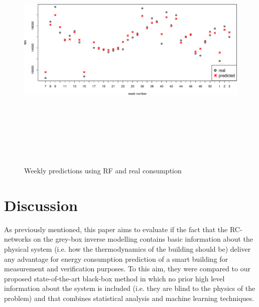 \documentclass[10pt, conference, compsocconf]{IEEEtran}
\begin{document}
\begin{figure}[t!]\label{fig:weekly}%
\centering
\centerline{\includegraphics[width=12cm,height=12cm,keepaspectratio]{./pics/weekly.pdf}}
\caption{Weekly predictions using RF and real consumption}\vspace*{-6pt}
  \label{fig:weekly}
\end{figure}

\section{Discussion}

As previously mentioned, this paper aims to evaluate if the fact that the RC-networks on the grey-box inverse modelling contains basic information about the physical system (i.e. how the thermodynamics of the building should be) deliver any advantage for energy consumption prediction of a smart building for measurement and verification purposes. To this aim, they were compared to our proposed state-of-the-art black-box method in which no prior high level information about the system is included (i.e. they are blind to the physics of the problem) and that combines statistical analysis and machine learning techniques. %

\end{document}
